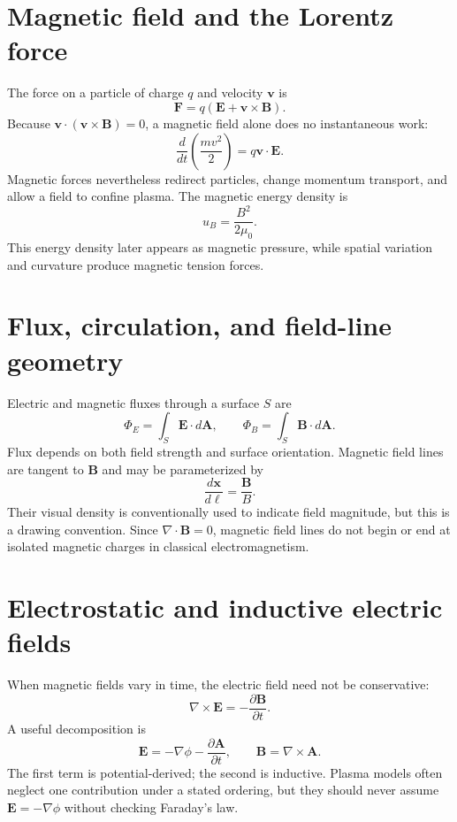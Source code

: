 \documentclass[11pt]{article}
\begin{document}
\section{Magnetic field and the Lorentz force}

The force on a particle of charge $q$ and velocity $\mathbf v$ is
\begin{equation}
\mathbf F=q\left(\mathbf E+\mathbf v\times\mathbf B\right).
\end{equation}
Because $\mathbf v\cdot(\mathbf v\times\mathbf B)=0$, a magnetic field alone does no instantaneous work:
\begin{equation}
\frac{d}{dt}\left(\frac{mv^2}{2}\right)=q\mathbf v\cdot\mathbf E.
\end{equation}
Magnetic forces nevertheless redirect particles, change momentum transport, and allow a field to confine plasma. The magnetic energy density is
\begin{equation}
u_B=\frac{B^2}{2\mu_0}.
\end{equation}
This energy density later appears as magnetic pressure, while spatial variation and curvature produce magnetic tension forces.


\section{Flux, circulation, and field-line geometry}

Electric and magnetic fluxes through a surface $S$ are
\begin{equation}
\Phi_E=\int_S\mathbf E\cdot d\mathbf A,\qquad
\Phi_B=\int_S\mathbf B\cdot d\mathbf A.
\end{equation}
Flux depends on both field strength and surface orientation. Magnetic field lines are tangent to $\mathbf B$ and may be parameterized by
\begin{equation}
\frac{d\mathbf x}{d\ell}=\frac{\mathbf B}{B}.
\end{equation}
Their visual density is conventionally used to indicate field magnitude, but this is a drawing convention. Since $\nabla\cdot\mathbf B=0$, magnetic field lines do not begin or end at isolated magnetic charges in classical electromagnetism.


\section{Electrostatic and inductive electric fields}

When magnetic fields vary in time, the electric field need not be conservative:
\begin{equation}
\nabla\times\mathbf E=-\frac{\partial\mathbf B}{\partial t}.
\end{equation}
A useful decomposition is
\begin{equation}
\mathbf E=-\nabla\phi-\frac{\partial\mathbf A}{\partial t},\qquad
\mathbf B=\nabla\times\mathbf A.
\end{equation}
The first term is potential-derived; the second is inductive. Plasma models often neglect one contribution under a stated ordering, but they should never assume $\mathbf E=-\nabla\phi$ without checking Faraday's law.
\end{document}

